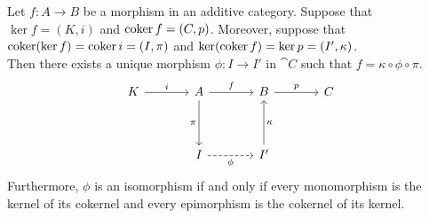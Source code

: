 \begin{proposition}\label{fit}
Let $f : A \to B$ be a morphism in an additive category. Suppose that $\ker f = (K,i)$ and $\operatorname{coker} f = (C,p)$. Moreover, suppose that $\operatorname{coker}(\ker f) = \operatorname{coker} i =  (I, \pi)$ and $\ker(\operatorname{coker} f) = \ker p = (I',\kappa)$.\\[0.5em]
Then there exists a unique morphism $\phi: I \to I'$ in $\cat{C}$ such that $f = \kappa \circ \phi \circ \pi$.
\[\begin{tikzcd}[row sep=huge, column sep = large]
K \arrow[r, "i"] & A \arrow[r, "f"] \arrow[d, "\pi"'] & B \arrow[r, "p"]        & C \\
                 & I \arrow[r, "\phi"', dashed]          & I' \arrow[u, "\kappa"'] &  
\end{tikzcd}\]
Furthermore, $\phi$ is an isomorphism if and only if every monomorphism is the kernel of its cokernel and every epimorphism is the cokernel of its kernel.
\end{proposition}
